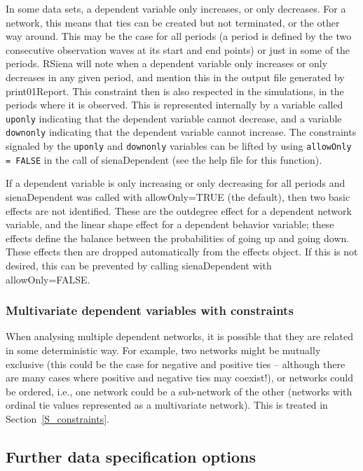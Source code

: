 \documentclass[a4paper,fleqn,11pt]{article}
\newcommand{\+}{\, + \,}
\newcommand{\sfn}[1]{\textsf{#1}}
\newcommand{\RS}{{\sf \textsf{RSiena} }}
\begin{document}
In some data sets, a dependent variable only increases, or only decreases.
For a network, this means that ties can be created but not terminated,
or the other way around.
This may be the case for all periods (a period is defined by the
two consecutive observation waves at its start and end points)
or just in some of the periods.
\RS will note when a dependent variable only increases or only decreases
in any given period,
and mention this in the output file generated by \textsf{print01Report}.
This constraint then is also respected in the simulations, in the periods
where it is observed.
This is represented
internally by a variable called \texttt{uponly} indicating that the
dependent variable cannot decrease,
and a variable \texttt{downonly} indicating that the
dependent variable cannot increase.
The constraints signaled by the  \texttt{uponly} and  \texttt{downonly}
variables can be lifted by using \texttt{allowOnly = FALSE}
in the call of \textsf{sienaDependent} (see the help file for this function).

If a dependent variable is only increasing or only decreasing
for all periods and \textsf{sienaDependent} was called with
\sfn{allowOnly=TRUE} (the default),
then two basic effects are not identified.
These are the outdegree effect for a dependent network variable,
and the linear shape effect for a dependent behavior variable;
these effects define the balance between the probabilities of
going up and going down.
These effects then are dropped automatically from the effects object.
If this is not desired, this can be prevented
by calling \textsf{sienaDependent} with \sfn{allowOnly=FALSE}.


\subsubsection{Multivariate dependent variables with constraints}
\label{S_constraints0}

When analysing multiple dependent networks, it is possible that they
are related in some deterministic way. For example, two networks
might be mutually exclusive (this could be the case for negative and positive
ties -- although there are many cases where positive
and negative ties may coexist!), or networks could be ordered, i.e.,
one network could be a sub-network of the other
(networks with ordinal tie values represented as a multivariate network).
This is treated in Section~\ref{S_constraints}.


\subsection{Further data specification options}
\label{S_usertrans}
\end{document}
